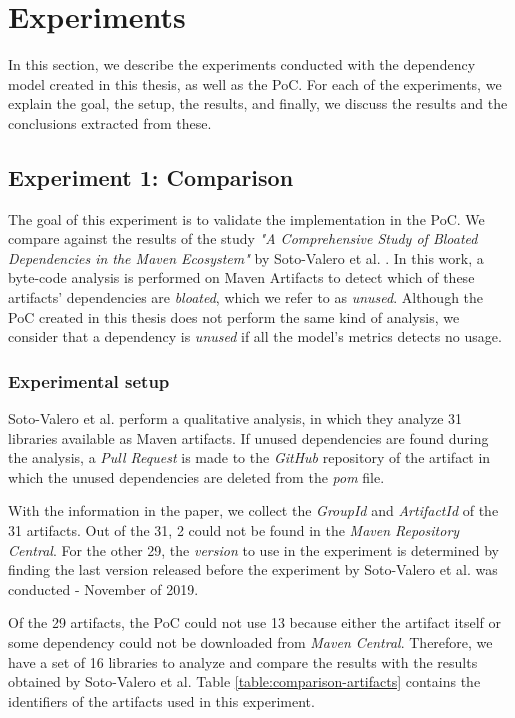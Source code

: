 \chapter{Experiments}\label{ch:Experiments}
In this section, we describe the experiments conducted with the dependency model created in this thesis, as well as the PoC. For each of the experiments, we explain the goal, the setup, the results, and finally, we discuss the results and the conclusions extracted from these.

\section{Experiment 1: Comparison}\label{sec:Exp1}
The goal of this experiment is to validate the implementation in the PoC. We compare against the results of the study \textit{"A Comprehensive Study of Bloated Dependencies in the Maven Ecosystem"} by Soto-Valero et al. \cite{soto2020comprehensive}. In this work, a byte-code analysis is performed on Maven Artifacts to detect which of these artifacts' dependencies are \textit{bloated}, which we refer to as \textit{unused}. Although the PoC created in this thesis does not perform the same kind of analysis, we consider that a dependency is \textit{unused} if all the model's metrics detects no usage.

\subsection{Experimental setup}
Soto-Valero et al. perform a qualitative analysis, in which they analyze 31 libraries available as Maven artifacts. If unused dependencies are found during the analysis, a \textit{Pull Request} is made to the \textit{GitHub} repository of the artifact in which the unused dependencies are deleted from the \textit{pom} file.

With the information in the paper, we collect the \textit{GroupId} and \textit{ArtifactId} of the 31 artifacts. Out of the 31, 2 could not be found in the \textit{Maven Repository Central}. For the other 29, the \textit{version} to use in the experiment is determined by finding the last version released before the experiment by Soto-Valero et al. was conducted - November of 2019.

Of the 29 artifacts, the PoC could not use 13 because either the artifact itself or some dependency could not be downloaded from \textit{Maven Central}. Therefore, we have a set of 16 libraries to analyze and compare the results with the results obtained by Soto-Valero et al. Table \ref{table:comparison-artifacts} contains the identifiers of the artifacts used in this experiment.

